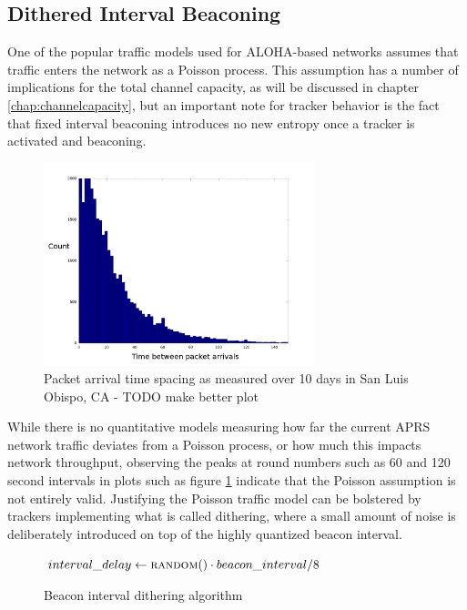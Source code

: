 \subsection{Dithered Interval Beaconing}

One of the popular traffic models used for ALOHA-based networks assumes
that traffic enters the network as a Poisson process. 
This assumption has a number of implications for the total channel capacity, 
as will be discussed in chapter \ref{chap:channelcapacity},
but an important note for tracker behavior is the fact that fixed interval
beaconing introduces no new entropy once a tracker is activated and beaconing.

\begin{figure}
	\centering
	\includegraphics[width=0.7\textwidth]{src/slorfarrival}
	\caption{Packet arrival time spacing as measured over 10 days
	in San Luis Obispo, CA - TODO make better plot}
	\label{fig:rfarrivaldist}
\end{figure}

While there is no quantitative models measuring how far the current APRS 
network traffic deviates from a Poisson process, 
or how much this impacts network throughput,
observing the peaks at round numbers such as 60 and 120 second intervals
in plots such as figure \ref{fig:rfarrivaldist} indicate that the Poisson
assumption is not entirely valid.
Justifying the Poisson traffic model can be bolstered by trackers 
implementing what is called
dithering, where a small amount of noise is deliberately introduced on top
of the highly quantized beacon interval.

\begin{figure}
\begin{algorithmic}
\State $interval\_delay \gets \Call{random}{ } \cdot beacon\_interval / 8$
	\State {}
	\State {}

\EndWhile
\end{algorithmic}
\caption{Beacon interval dithering algorithm}
\label{fig:ditheringalg}
\end{figure}

